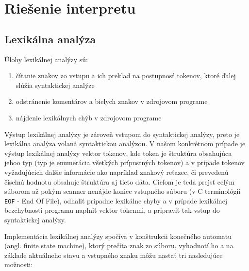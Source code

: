 \documentclass[12pt,a4paper,titlepage,final]{article}
\begin{document}
\pagestyle{plain}
\tableofcontents

\newpage
\pagestyle{plain}
\setcounter{page}{1}


\section{Riešenie interpretu} \label{Riesenie interpretu}

\subsection{Lexikálna analýza}
Úlohy lexikálnej analýzy sú:
\begin{enumerate}
    \itemsep0em
    \item čítanie znakov zo vstupu a ich preklad na postupnosť tokenov, ktoré ďalej slúžia syntaktickej analýze
    \item odstránenie komentárov a bielych znakov v zdrojovom programe
    \item nájdenie lexikálnych chýb v zdrojovom programe
\end{enumerate}

Výstup lexikálnej analýzy je zároveň vstupom do syntaktickej analýzy, preto je
lexikálna analýza volaná syntaktickou analýzou. V našom konkrétnom prípade je
výstup lexikálnej analýzy vektor tokenov, kde token je štruktúra obsahujúca
jehoo typ (typ je enumerácia všetkých prípustných tokenov)
a v prípade tokenov vyžadujúcich dalšie informácie ako napríklad znakový reťazec,
či prevedenú číselnú hodnotu obsahuje štruktúra aj tieto dáta.
Cieľom je teda prejsť celým súborom až pokým scanner nenájde koniec vstupného súboru
(v C terminológii \texttt{EOF} - End Of File), odhaliť prípadne lexikálne chyby a
v prípade lexikálnej bezchybnosti programu naplniť vektor tokenmi, a pripraviť
tak vstup do syntaktickej analýzy.

Implementácia lexikálnej analýzy spočíva v konštrukcii konečného automatu
(angl. finite state machine), ktorý prečíta znak zo súboru, vyhodnotí
ho a na základe aktuálneho stavu a vstupného znaku môžu nastať tri nasledujúce
možnosti:
\end{document}
